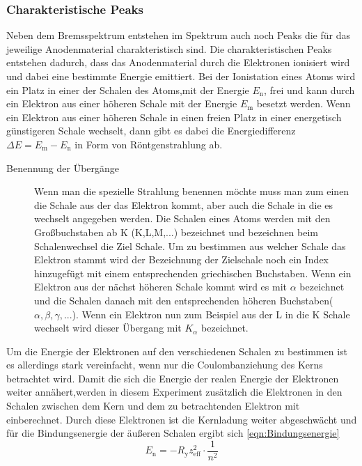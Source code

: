 \subsubsection{Charakteristische Peaks}
Neben dem Bremsspektrum entstehen im Spektrum auch noch Peaks die für das jeweilige Anodenmaterial charakteristisch sind.
Die charakteristischen Peaks entstehen dadurch, dass das Anodenmaterial durch die Elektronen ionisiert wird und dabei eine bestimmte Energie emittiert.
Bei der Ionistation eines Atoms wird ein Platz in einer der Schalen des Atoms,mit der Energie $E_{\text{n}}$, frei und kann durch ein Elektron aus einer höheren Schale mit der Energie $E_{\text{m}}$ besetzt werden.
Wenn ein Elektron aus einer höheren Schale in einen freien Platz in einer energetisch günstigeren Schale wechselt, dann gibt es dabei die Energiedifferenz $\Delta E = E_{\text{m}} -E_{\text{n}}$ in Form von Röntgenstrahlung ab.
\begin{description}
    \item[Benennung der Übergänge]
    Wenn man die spezielle Strahlung benennen möchte muss man zum einen die Schale aus der das Elektron kommt, aber auch die Schale in die es wechselt angegeben werden.
    Die Schalen eines Atoms werden mit den Großbuchstaben ab K (K,L,M,...) bezeichnet und bezeichnen beim Schalenwechsel die Ziel Schale.
    Um zu bestimmen aus welcher Schale das Elektron stammt wird der Bezeichnung der Zielschale noch ein Index hinzugefügt mit einem entsprechenden griechischen Buchstaben.
    Wenn ein Elektron aus der nächst höheren Schale kommt wird es mit $\alpha$ bezeichnet und die Schalen danach mit den entsprechenden höheren Buchstaben($\alpha,\beta,\gamma,...$).
    Wenn ein Elektron nun zum Beispiel aus der L in die K Schale wechselt wird dieser Übergang mit $K_{\alpha}$ bezeichnet.
\end{description}
Um die Energie der Elektronen auf den verschiedenen Schalen zu bestimmen ist es allerdings stark vereinfacht, wenn nur die Coulombanziehung des Kerns betrachtet wird.
Damit die sich die Energie der realen Energie der Elektronen weiter annähert,werden in diesem Experiment zusätzlich die Elektronen in den Schalen zwischen dem Kern und dem zu betrachtenden Elektron mit einberechnet.
Durch diese Elektronen ist die Kernladung weiter abgeschwächt und für die Bindungsenergie der äußeren Schalen ergibt sich \ref{eqn:Bindungsenergie}
\begin{equation}
    E_{\text{n}} = -R_{\text{y}} z_{\text{eff}}^2 \cdot \frac{1}{n^2} \label{eqn:Bindungsenergie}
\end{equation}
